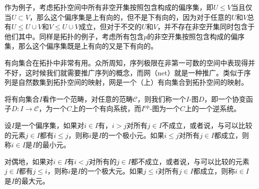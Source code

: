 作为例子，考虑拓扑空间中所有非空开集按照包含构成的偏序集，即$U\leq V$当且仅当$U\subset V$，那么这个偏序集是上有向的，但不是下有向的，因为对于任意的$U$和$V$总有$U\leq U\cup V$和$V\leq U\cup V$成立，但对于不交的$U$和$V$，并不存在非空开集同时包含于他们其中。同样是拓扑的例子，考虑所有包含$p$的非空开集按照包含构成的偏序集，那么这个偏序集既是上有向的又是下有向的。

有向集合在拓扑中非常有用。众所周知，序列极限在非第一可数的空间中表现得并不好，这时候我们就需要推广序列的概念，而网（net）就是一种推广。类似于序列是自然数集到拓扑空间的映射，网是一个（上）有向集合到拓扑空间的映射。

\begin{para}
将有向集合$I$看作一个范畴，对任意的范畴$\mathcal{C}$，则我们称一个$I$-图$D$，即一个协变函子$D:I\to \mathcal{C}$，为一个$C$上的一个有向系统，而$I^\text{op}$-图为一个$C$上的一个逆系统。
\end{para}


\begin{para}
设$I$是一个偏序集，如果对$i\in I$有，$i>j$对所有$j\in I$不成立，或者说，与可以比较的元素$j\in I$都有$i\leq j$，则称$i$是$I$的一个极小元。如果$i\leq j$对所有$j\in I$都成立，则称$i\in I$是$I$的最小元。

对偶地，如果对$i\in I$有$i<j$对所有的$j\in I$都不成立，或者说，与可以比较的元素$j\in I$都有$j\leq i$，则称$i$是$I$的一个极大元。如果$j\leq i$对所有$j\in I$都成立，则称$i\in I$是$I$的最大元。
\end{para}

